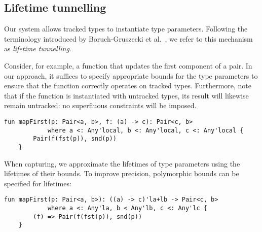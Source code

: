 \documentclass[acmsmall,review,screen]{acmart}
\begin{document}
\subsection{Lifetime tunnelling}

Our system allows tracked types to instantiate type parameters.
Following the terminology introduced by Boruch-Gruszecki et al.~\cite{boruch2023capturing}, we refer to this mechanism as \emph{lifetime tunnelling}.

Consider, for example, a function that updates the first component of a pair.
In our approach, it suffices to specify appropriate bounds for the type parameters to ensure that the function correctly operates on tracked types.
Furthermore, note that if the function is instantiated with untracked types, its result will likewise remain untracked: no superfluous constraints will be imposed.
\begin{lstlisting}[language=colang]
    fun mapFirst(p: Pair<a, b>, f: (a) -> c): Pair<c, b>
            where a <: Any'local, b <: Any'local, c <: Any'local {
        Pair(f(fst(p)), snd(p))
    }
\end{lstlisting}

When capturing, we approximate the lifetimes of type parameters using the
lifetimes of their bounds.
To improve precision, polymorphic bounds can
be specified for lifetimes:
\begin{lstlisting}[language=colang]
    fun mapFirst(p: Pair<a, b>): ((a) -> c)'la+lb -> Pair<c, b>
            where a <: Any'la, b < Any'lb, c <: Any'lc {
        (f) => Pair(f(fst(p)), snd(p))
    }
\end{lstlisting}


%

%
%
\end{document}

